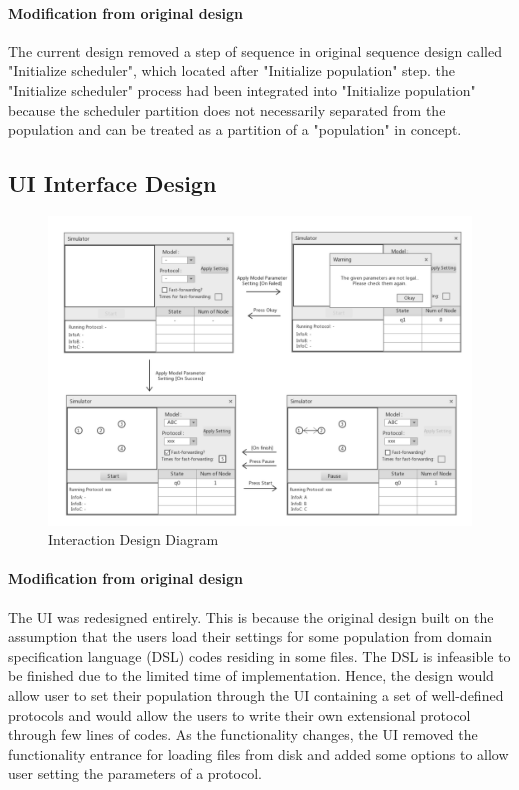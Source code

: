  \paragraph{Modification from original design}
The current design removed a step of sequence in original sequence design called "Initialize scheduler", which located after "Initialize population" step.
the "Initialize scheduler" process had been integrated into "Initialize population" because
the scheduler partition does not necessarily separated from the population and can be treated as a partition of a "population" in concept.

\subsection{UI Interface Design}
\begin{figure}[H]
\begin{center}
\includegraphics[width =\textwidth]{context/diagram/interface.pdf}
\caption{Interaction Design Diagram}
\label{intefaceG}
\end{center}
\end{figure}

\paragraph{Modification from original design}
The UI was redesigned entirely. This is because the original design built on the assumption
that the users load their settings for some population from domain specification language (DSL) codes residing in
some files. The DSL is infeasible to be finished due to the limited time of implementation.
Hence, the design would allow user to set their population through the UI containing a set of well-defined
protocols and would allow the users to write their own extensional protocol through few lines of codes.
As the functionality changes, the UI removed the functionality entrance for loading files from disk and
added some options to allow user setting the parameters of a protocol.
